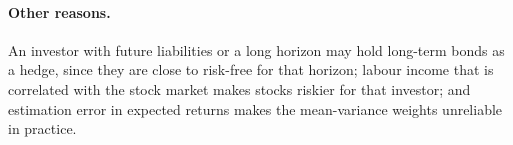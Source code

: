 \documentclass[11pt]{article}
\begin{document}
\paragraph{Other reasons.}
An investor with future liabilities or a long horizon may hold long-term bonds as a hedge, since they are close to risk-free for that horizon; labour income that is correlated with the stock market makes stocks riskier for that investor; and estimation error in expected returns makes the mean-variance weights unreliable in practice.
\end{document}
